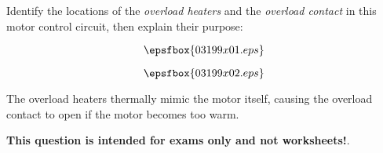 

Identify the locations of the {\it overload heaters} and the {\it overload contact} in this motor control circuit, then explain their purpose:

$$\epsfbox{03199x01.eps}$$







$$\epsfbox{03199x02.eps}$$

The overload heaters thermally mimic the motor itself, causing the overload contact to open if the motor becomes too warm.







{\bf This question is intended for exams only and not worksheets!}.




